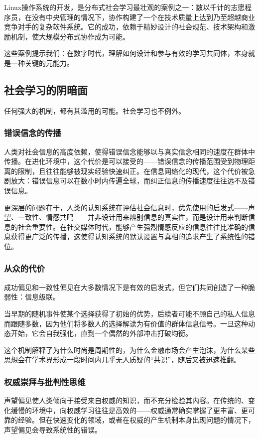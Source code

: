 \documentclass[11pt]{article}
\begin{document}
Linux操作系统的开发，是分布式社会学习最壮观的案例之一：数以千计的志愿程序员，在没有中央管理的情况下，协作构建了一个在技术质量上达到乃至超越商业竞争对手的复杂软件系统。它的成功，依赖于精妙设计的社会规范、技术架构和激励机制，使大规模分布式协作成为可能。

这些案例提示我们：在数字时代，理解如何设计和参与有效的学习共同体，本身就是一种关键的元能力。
\subsection{社会学习的阴暗面}
\label{sec:org2c31b8e}

任何强大的机制，都有其滥用的可能。社会学习也不例外。
\subsubsection{错误信念的传播}
\label{sec:orgeed431d}

人类对社会信息的高度依赖，使得错误信念能够以与真实信念相同的速度在群体中传播。在进化环境中，这个代价是可以接受的——错误信念的传播范围受到物理距离的限制，且往往能够被现实经验快速纠正。在信息网络化的现代，这个代价被急剧放大：错误信息可以在数小时内传遍全球，而纠正信息的传播速度往往远不及错误信息。

更深层的问题在于，人类的认知系统在评估社会信息时，优先使用的启发式——声望、一致性、情感共鸣——并非设计用来辨别信息的真实性，而是设计用来判断信息的社会重要性。在社交媒体时代，能够产生强烈情感反应的信息往往比准确的信息获得更广泛的传播，这使得认知系统的默认设置与真相的追求产生了系统性的错位。
\subsubsection{从众的代价}
\label{sec:org5d983f4}

成功偏见和一致性偏见在大多数情况下是有效的启发式，但它们共同创造了一种脆弱性：信息级联。

当早期的随机事件使某个选择获得了初始的优势，后续者可能不顾自己的私人信息而跟随多数，因为他们将多数人的选择解读为有价值的群体信息信号。一旦这种动态开始，它会自我强化，直到一个偶然的外部冲击打破均衡。

这个机制解释了为什么时尚是周期性的，为什么金融市场会产生泡沫，为什么某些思想会在学术界形成一段时间内几乎无人质疑的“共识”，随后又被迅速推翻。
\subsubsection{权威崇拜与批判性思维}
\label{sec:org270446c}

声望偏见使人类倾向于接受来自权威的知识，而不充分检验其内容。在传统的、变化缓慢的环境中，向权威学习往往是高效的——权威通常确实掌握了更丰富、更可靠的经验。但在快速变化的领域，或者在权威的产生机制本身出现问题的情况下，声望偏见会导致系统性的错误。
\end{document}
